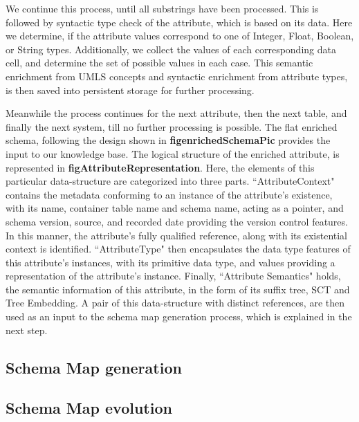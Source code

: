 We continue this process, until all substrings have been processed. This is followed by syntactic type check of the attribute, which is based on its data. Here we determine, if the attribute values correspond to one of Integer, Float, Boolean, or String types. Additionally, we collect the values of each corresponding data cell, and determine the set of possible values in each case. 
This semantic enrichment from UMLS concepts and syntactic enrichment from attribute types, is then saved into persistent storage for further processing. 

Meanwhile the process continues for the next attribute, then the next table, and finally the next system, till no further processing is possible. The flat enriched schema, following the design shown in \textbf{figenrichedSchemaPic} provides the input to our knowledge base. The logical structure of the enriched attribute, is represented in \textbf{figAttributeRepresentation}. Here, the elements of this particular data-structure are categorized into three parts. ``AttributeContext" contains the metadata conforming to an instance of the attribute's existence,  with its name, container table name and schema name, acting as a pointer, and schema version, source, and recorded date providing the version control features. In this manner, the attribute's fully qualified reference, along with its existential context is identified. ``AttributeType" then encapsulates the data type features of this attribute's instances, with its primitive data type, and values providing a representation of the attribute's instance. Finally, ``Attribute Semantics" holds, the semantic information of this attribute, in the form of its suffix tree, SCT and Tree Embedding.
A pair of this data-structure with distinct references, are then used as an input to the schema map generation process, which is explained in the next step.

\subsection*{Schema Map generation}
\label{schema_map_gen}


\subsection*{Schema Map evolution}
\label{schema_map_evol}

